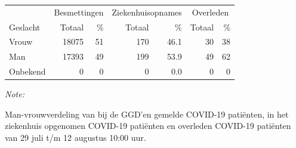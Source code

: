 \documentclass[
  english,
  man,floatsintext]{apa6}
\begin{document}
\begin{table}
\centering\begingroup\fontsize{11}{13}\selectfont

\begin{threeparttable}
\begin{tabular}{lrrrrrr}
\toprule
\multicolumn{1}{c}{ } & \multicolumn{2}{c}{Besmettingen} & \multicolumn{2}{c}{Ziekenhuisopnames} & \multicolumn{2}{c}{Overleden} \\
\cmidrule(l{3pt}r{3pt}){2-3} \cmidrule(l{3pt}r{3pt}){4-5} \cmidrule(l{3pt}r{3pt}){6-7}
Geslacht & Totaal & \% & Totaal & \% & Totaal & \%\\
\midrule
Vrouw & 18075 & 51 & 170 & 46.1 & 30 & 38\\
Man & 17393 & 49 & 199 & 53.9 & 49 & 62\\
Onbekend & 0 & 0 & 0 & 0.0 & 0 & 0\\
\bottomrule
\end{tabular}
\begin{tablenotes}
\item \textit{Note: } 
\item Man-vrouwverdeling van bij de GGD’en gemelde COVID-19 patiënten, in het ziekenhuis opgenomen COVID-19 patiënten en overleden COVID-19 patiënten van 29 juli t/m 12 augustus 10:00 uur.
\end{tablenotes}
\end{threeparttable}
\endgroup{}
\end{table}
\newpage
\end{document}
